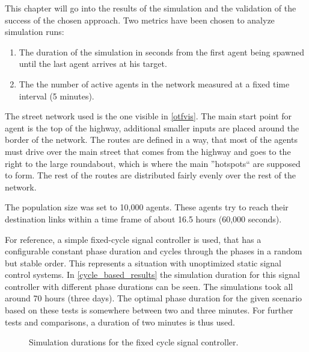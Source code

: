 This chapter will go into the results of the simulation and the validation of the success of the chosen approach. Two metrics have been chosen to analyze simulation runs:

\begin{enumerate}
	\item The duration of the simulation in seconds from the first agent being spawned until the last agent arrives at his target.
	\item The the number of active agents in the network measured at a fixed time interval (5 minutes).
\end{enumerate}

The street network used is the one visible in \autoref{otfvis}. The main start point for agent is the top of the highway, additional smaller inputs are placed around the border of the network. The routes are defined in a way, that most of the agents must drive over the main street that comes from the highway and goes to the right to the large roundabout, which is where the main ''hotspots`` are supposed to form. The rest of the routes are distributed fairly evenly over the rest of the network.

The population size was set to 10,000 agents. These agents try to reach their destination links within a time frame of about 16.5 hours (60,000 seconds).

For reference, a simple fixed-cycle signal controller is used, that has a configurable constant phase duration and cycles through the phases in a random but stable order. This represents a situation with unoptimized static signal control systems. In \autoref{cycle_based_results} the simulation duration for this signal controller with different phase durations can be seen. The simulations took all around 70 hours (three days). The optimal phase duration for the given scenario based on these tests is somewhere between two and three minutes. For further tests and comparisons, a duration of two minutes is thus used.

\begin{figure}
	\centering	
	\label{cycle_based_results}
	\caption{Simulation durations for the fixed cycle signal controller.}
\end{figure}

